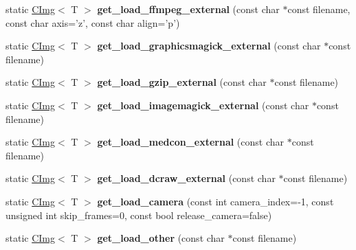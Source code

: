 \begin{DoxyCompactItemize}
\item 
\hypertarget{structcimg__library_1_1CImg_a883c2a31a26f1b8767db6456b952c949}{
static \hyperlink{structcimg__library_1_1CImg}{CImg}$<$ T $>$ {\bfseries get\_\-load\_\-ffmpeg\_\-external} (const char $\ast$const filename, const char axis='z', const char align='p')}
\label{structcimg__library_1_1CImg_a883c2a31a26f1b8767db6456b952c949}

\item 
\hypertarget{structcimg__library_1_1CImg_a5cd75e6518130915e0c5f006b5bec758}{
static \hyperlink{structcimg__library_1_1CImg}{CImg}$<$ T $>$ {\bfseries get\_\-load\_\-graphicsmagick\_\-external} (const char $\ast$const filename)}
\label{structcimg__library_1_1CImg_a5cd75e6518130915e0c5f006b5bec758}

\item 
\hypertarget{structcimg__library_1_1CImg_a3f62a13e6dcbbdc8c7bdd6608017602b}{
static \hyperlink{structcimg__library_1_1CImg}{CImg}$<$ T $>$ {\bfseries get\_\-load\_\-gzip\_\-external} (const char $\ast$const filename)}
\label{structcimg__library_1_1CImg_a3f62a13e6dcbbdc8c7bdd6608017602b}

\item 
\hypertarget{structcimg__library_1_1CImg_a614be4016c404396a28121dd2d9ee477}{
static \hyperlink{structcimg__library_1_1CImg}{CImg}$<$ T $>$ {\bfseries get\_\-load\_\-imagemagick\_\-external} (const char $\ast$const filename)}
\label{structcimg__library_1_1CImg_a614be4016c404396a28121dd2d9ee477}

\item 
\hypertarget{structcimg__library_1_1CImg_a99ef8bf8fc4f76517d93c831fdfca562}{
static \hyperlink{structcimg__library_1_1CImg}{CImg}$<$ T $>$ {\bfseries get\_\-load\_\-medcon\_\-external} (const char $\ast$const filename)}
\label{structcimg__library_1_1CImg_a99ef8bf8fc4f76517d93c831fdfca562}

\item 
\hypertarget{structcimg__library_1_1CImg_a0537809dca1c2f2f5e35965d45f5b52c}{
static \hyperlink{structcimg__library_1_1CImg}{CImg}$<$ T $>$ {\bfseries get\_\-load\_\-dcraw\_\-external} (const char $\ast$const filename)}
\label{structcimg__library_1_1CImg_a0537809dca1c2f2f5e35965d45f5b52c}

\item 
\hypertarget{structcimg__library_1_1CImg_a55113b53b07ac8682c9e1ca7c9d93e2d}{
static \hyperlink{structcimg__library_1_1CImg}{CImg}$<$ T $>$ {\bfseries get\_\-load\_\-camera} (const int camera\_\-index=-\/1, const unsigned int skip\_\-frames=0, const bool release\_\-camera=false)}
\label{structcimg__library_1_1CImg_a55113b53b07ac8682c9e1ca7c9d93e2d}

\item 
\hypertarget{structcimg__library_1_1CImg_aa4fba9dc33b1edf2eacb59acebba962d}{
static \hyperlink{structcimg__library_1_1CImg}{CImg}$<$ T $>$ {\bfseries get\_\-load\_\-other} (const char $\ast$const filename)}
\label{structcimg__library_1_1CImg_aa4fba9dc33b1edf2eacb59acebba962d}

\end{DoxyCompactItemize}
